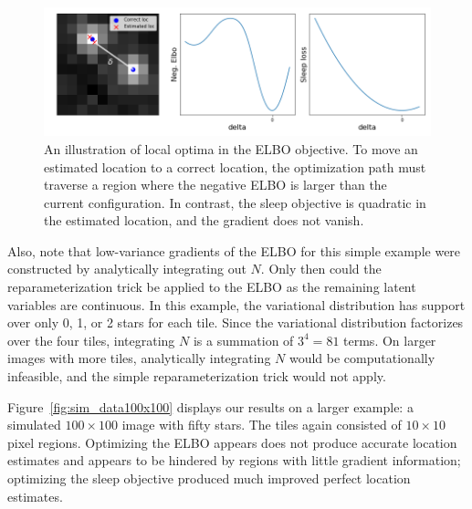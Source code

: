 \begin{figure}[!htb]
    \centering
    \includegraphics[width=\textwidth]{figures/local_minima_cartoon.png}
    \caption{An illustration of local optima in the ELBO objective. 
    To move an estimated location to a correct location, 
    the optimization path must traverse a region where the negative ELBO is larger than the current configuration. 
    In contrast, the sleep objective is quadratic in the estimated location, and the gradient does not vanish. }
    \label{fig:local_optima_cartoon}
\end{figure}

Also, note that low-variance gradients of the ELBO for this simple example were constructed by analytically integrating out $N$. Only then could the reparameterization trick be applied to the ELBO as the remaining latent variables are continuous. 
In this example, the variational distribution has support over only 0, 1, or 2 stars for each tile. 
Since the variational distribution factorizes over the four tiles, integrating $N$ is a summation of $3^4 = 81$ terms.
On larger images with more tiles, analytically integrating $N$ would be computationally infeasible, 
and the simple reparameterization trick would not apply. 

Figure~\ref{fig:sim_data100x100} displays our results on a larger example: a simulated $100\times 100$ image with fifty stars. 
The tiles again consisted of $10\times 10$ pixel regions. 
Optimizing the ELBO appears does not produce accurate location estimates and appears to be hindered by regions with little gradient information; optimizing the sleep objective produced much improved perfect location estimates.


